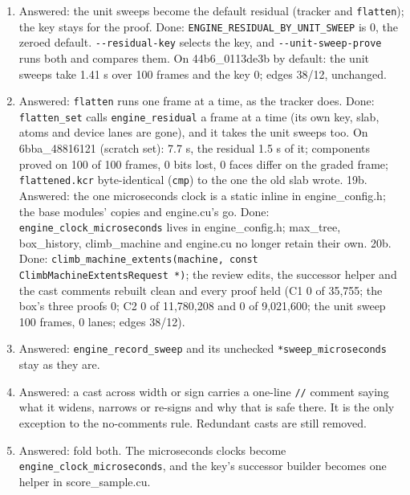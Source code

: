 \begin{enumerate}
\item Answered: the unit sweeps become the default residual (tracker and \texttt{flatten}); the key stays for the proof. Done: \texttt{ENGINE\_\allowbreak{}RESIDUAL\_\allowbreak{}BY\_\allowbreak{}UNIT\_\allowbreak{}SWEEP} is 0, the zeroed default. \texttt{-\allowbreak{}-\allowbreak{}residual-\allowbreak{}key} selects the key, and \texttt{-\allowbreak{}-\allowbreak{}unit-\allowbreak{}sweep-\allowbreak{}prove} runs both and compares them. On 44b6\_\allowbreak{}0113de3b by default: the unit sweeps take 1.41 s over 100 frames and the key 0; edges 38/12, unchanged.
\item Answered: \texttt{flatten} runs one frame at a time, as the tracker does. Done: \texttt{flatten\_\allowbreak{}set} calls \texttt{engine\_\allowbreak{}residual} a frame at a time (its own key, slab, atoms and device lanes are gone), and it takes the unit sweeps too. On 6bba\_\allowbreak{}48816121 (scratch set): 7.7 s, the residual 1.5 s of it; components proved on 100 of 100 frames, 0 bits lost, 0 faces differ on the graded frame; \texttt{flattened.\allowbreak{}kcr} byte-identical (\texttt{cmp}) to the one the old slab wrote. 19b. Answered: the one microseconds clock is a static inline in engine\_\allowbreak{}config.h; the base modules' copies and engine.cu's go. Done: \texttt{engine\_\allowbreak{}clock\_\allowbreak{}microseconds} lives in engine\_\allowbreak{}config.h; max\_\allowbreak{}tree, box\_\allowbreak{}history, climb\_\allowbreak{}machine and engine.cu no longer retain their own. 20b. Done: \texttt{climb\_\allowbreak{}machine\_\allowbreak{}extents(machine, const Climb\allowbreak{}Machine\allowbreak{}Extents\allowbreak{}Request *)}; the review edits, the successor helper and the cast comments rebuilt clean and every proof held (C1 0 of 35,755; the box's three proofs 0; C2 0 of 11,780,208 and 0 of 9,021,600; the unit sweep 100 frames, 0 lanes; edges 38/12).
\item Answered: \texttt{engine\_\allowbreak{}record\_\allowbreak{}sweep} and its unchecked \texttt{*sweep\_\allowbreak{}microseconds} stay as they are.
\item Answered: a cast across width or sign carries a one-line \texttt{/\allowbreak{}/\allowbreak{}} comment saying what it widens, narrows or re-signs and why that is safe there. It is the only exception to the no-comments rule. Redundant casts are still removed.
\item Answered: fold both. The microseconds clocks become \texttt{engine\_\allowbreak{}clock\_\allowbreak{}microseconds}, and the key's successor builder becomes one helper in score\_\allowbreak{}sample.cu.

\end{enumerate}
